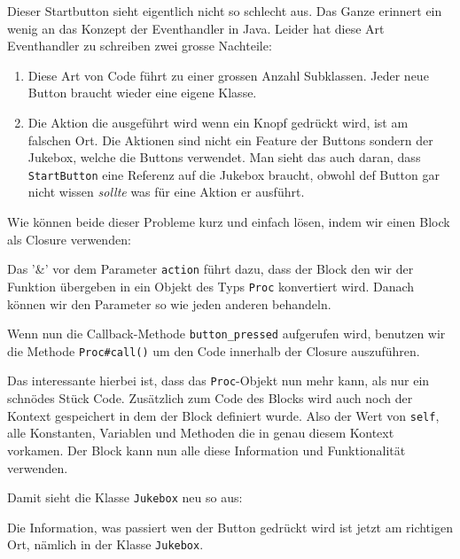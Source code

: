 \documentclass[a4book,11pt,twoside]{scrbook}
\begin{document}




Dieser Startbutton sieht eigentlich nicht so schlecht aus. Das Ganze erinnert ein wenig an das Konzept der Eventhandler in Java. Leider hat diese Art Eventhandler zu schreiben zwei grosse Nachteile:
\begin{enumerate}
	\item Diese Art von Code führt zu einer grossen Anzahl Subklassen. Jeder neue Button braucht wieder eine eigene Klasse.
	\item Die Aktion die ausgeführt wird wenn ein Knopf gedrückt wird, ist am falschen Ort. Die Aktionen sind nicht ein Feature der Buttons sondern der Jukebox, welche die Buttons verwendet. Man sieht das auch daran, dass \texttt{StartButton} eine Referenz auf die Jukebox braucht, obwohl def Button gar nicht wissen \emph{sollte} was für eine Aktion er ausführt.
\end{enumerate}

Wie können beide dieser Probleme kurz und einfach lösen, indem wir einen Block als Closure verwenden:



Das '\&' vor dem Parameter \texttt{action} führt dazu, dass der Block den wir der Funktion übergeben in ein Objekt des Typs \texttt{Proc} konvertiert wird. Danach können wir den Parameter so wie jeden anderen behandeln.

Wenn nun die Callback-Methode \texttt{button\_pressed} aufgerufen wird, benutzen wir die Methode \texttt{Proc\#call()} um den Code innerhalb der Closure auszuführen.

Das interessante hierbei ist, dass das \texttt{Proc}-Objekt nun mehr kann, als nur ein schnödes Stück Code. Zusätzlich zum Code des Blocks wird auch noch der Kontext gespeichert in dem der Block definiert wurde. Also der Wert von \texttt{self}, alle Konstanten, Variablen und Methoden die in genau diesem Kontext vorkamen. Der Block kann nun alle diese Information und Funktionalität verwenden.

Damit sieht die Klasse \texttt{Jukebox} neu so aus:



Die Information, was passiert wen der Button gedrückt wird ist jetzt am richtigen Ort, nämlich in der Klasse \texttt{Jukebox}.
\end{document}
